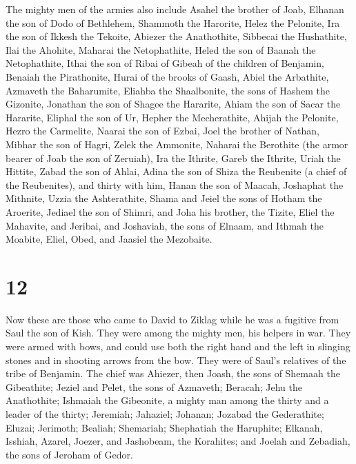 The mighty men of the armies also include Asahel the
brother of Joab, Elhanan the son of Dodo of Bethlehem, 
Shammoth the Harorite, Helez the Pelonite,  Ira the son of
Ikkesh the Tekoite, Abiezer the Anathothite,  Sibbecai the
Hushathite, Ilai the Ahohite,  Maharai the Netophathite,
Heled the son of Baanah the Netophathite,  Ithai the son of
Ribai of Gibeah of the children of Benjamin, Benaiah the Pirathonite,
 Hurai of the brooks of Gaash, Abiel the Arbathite,
 Azmaveth the Baharumite, Eliahba the Shaalbonite,
 the sons of Hashem the Gizonite, Jonathan the son of
Shagee the Hararite,  Ahiam the son of Sacar the Hararite,
Eliphal the son of Ur,  Hepher the Mecherathite, Ahijah the
Pelonite,  Hezro the Carmelite, Naarai the son of Ezbai,
 Joel the brother of Nathan, Mibhar the son of Hagri,
 Zelek the Ammonite, Naharai the Berothite (the armor
bearer of Joab the son of Zeruiah),  Ira the Ithrite, Gareb
the Ithrite,  Uriah the Hittite, Zabad the son of Ahlai,
 Adina the son of Shiza the Reubenite (a chief of the
Reubenites), and thirty with him,  Hanan the son of Maacah,
Joshaphat the Mithnite,  Uzzia the Ashterathite, Shama and
Jeiel the sons of Hotham the Aroerite,  Jediael the son of
Shimri, and Joha his brother, the Tizite,  Eliel the
Mahavite, and Jeribai, and Joshaviah, the sons of Elnaam, and Ithmah the
Moabite,  Eliel, Obed, and Jaasiel the Mezobaite.

\hypertarget{section-11}{%
\section{12}\label{section-11}}

 Now these are those who came to David to Ziklag while he
was a fugitive from Saul the son of Kish. They were among the mighty
men, his helpers in war.  They were armed with bows, and
could use both the right hand and the left in slinging stones and in
shooting arrows from the bow. They were of Saul's relatives of the tribe
of Benjamin.  The chief was Ahiezer, then Joash, the sons of
Shemaah the Gibeathite; Jeziel and Pelet, the sons of Azmaveth; Beracah;
Jehu the Anathothite;  Ishmaiah the Gibeonite, a mighty man
among the thirty and a leader of the thirty; Jeremiah; Jahaziel;
Johanan; Jozabad the Gederathite;  Eluzai; Jerimoth;
Bealiah; Shemariah; Shephatiah the Haruphite;  Elkanah,
Isshiah, Azarel, Joezer, and Jashobeam, the Korahites;  and
Joelah and Zebadiah, the sons of Jeroham of Gedor.

